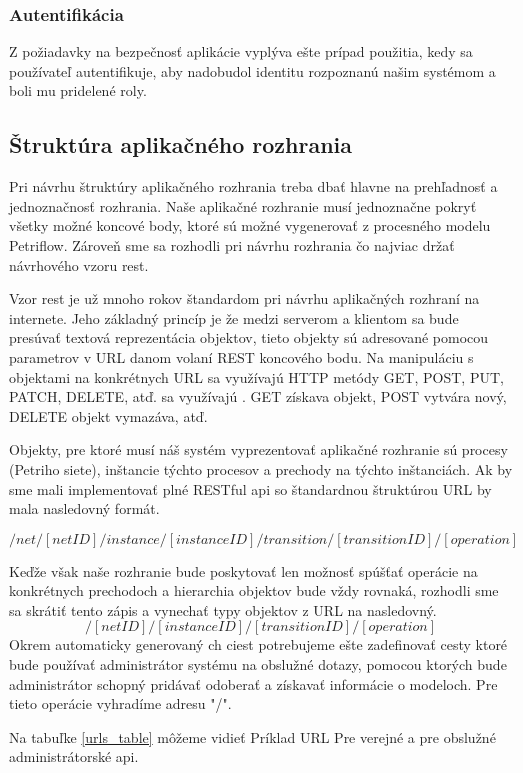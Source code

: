 \subsubsection{Autentifikácia}
Z požiadavky na bezpečnosť aplikácie vyplýva ešte prípad použitia, kedy sa používateľ autentifikuje, aby nadobudol identitu rozpoznanú našim systémom a boli mu pridelené roly.

\subsection{Štruktúra aplikačného rozhrania}
Pri návrhu štruktúry aplikačného rozhrania treba dbať hlavne na prehľadnosť a jednoznačnosť rozhrania. Naše aplikačné rozhranie musí jednoznačne pokryť všetky možné koncové body, ktoré sú možné vygenerovať z procesného modelu Petriflow. Zároveň sme sa rozhodli pri návrhu rozhrania čo najviac držať návrhového vzoru \acrshort{rest}. 

Vzor \acrshort{rest} je už mnoho rokov štandardom pri návrhu aplikačných rozhraní na internete. Jeho základný princíp je že medzi serverom a klientom sa bude presúvať textová reprezentácia objektov, tieto objekty sú adresované pomocou parametrov v URL danom volaní REST koncového bodu. Na manipuláciu s objektami na konkrétnych URL sa využívajú HTTP metódy GET, POST, PUT, PATCH, DELETE, atď.  sa využívajú . GET získava objekt, POST vytvára nový, DELETE objekt vymazáva, atď.

Objekty, pre ktoré musí náš systém vyprezentovať aplikačné rozhranie sú  procesy (Petriho siete), inštancie týchto procesov a prechody na týchto inštanciách. Ak by sme mali implementovať plné RESTful \acrshort{api} so štandardnou štruktúrou URL by mala nasledovný formát.

\[/net/[netID]/instance/[instanceID]/transition/[transitionID]/[operation] \]

Keďže však naše rozhranie bude poskytovať len možnosť spúšťať operácie na konkrétnych prechodoch a hierarchia objektov bude vždy rovnaká, rozhodli sme sa skrátiť tento zápis a vynechať typy objektov z URL na nasledovný.
\[/[netID]/[instanceID]/[transitionID]/[operation] \]
Okrem automaticky generovaný ch ciest potrebujeme ešte zadefinovať cesty ktoré bude používať administrátor systému na obslužné dotazy, pomocou ktorých bude administrátor schopný pridávať odoberať a získavať informácie o modeloch. Pre tieto operácie vyhradíme adresu "/".

Na tabuľke \ref{urls_table} môžeme vidieť  Príklad URL Pre verejné a pre obslužné administrátorské \acrshort{api}.

